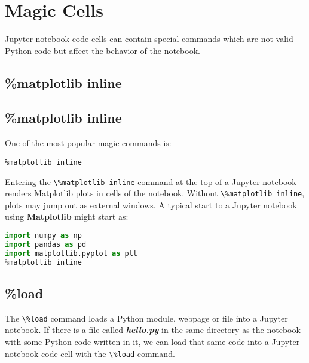 \documentclass{book}
\newcommand{\passthrough}[1]{#1}
\begin{document}
    
        \hypertarget{magic-cells}{%
\section{Magic Cells}\label{magic-cells}}
    




    
        Jupyter notebook code cells can contain special commands which are not
valid Python code but affect the behavior of the notebook.
    




    
        \hypertarget{matplotlib-inline}{%
\subsection{\%matplotlib inline}\label{matplotlib-inline}}
    




    
        \hypertarget{matplotlib-inline}{%
\subsection{\%matplotlib inline}\label{matplotlib-inline}}

One of the most popular magic commands is:

\begin{lstlisting}
%matplotlib inline
\end{lstlisting}

Entering the \passthrough{\lstinline!\%matplotlib inline!} command at
the top of a Jupyter notebook renders Matplotlib plots in cells of the
notebook. Without \passthrough{\lstinline!\%matplotlib inline!}, plots
may jump out as external windows. A typical start to a Jupyter notebook
using \textbf{Matplotlib} might start as:

\begin{lstlisting}[language=Python]
import numpy as np
import pandas as pd
import matplotlib.pyplot as plt
%matplotlib inline
\end{lstlisting}
    




    
        \hypertarget{load}{%
\subsection{\%load}\label{load}}

The \passthrough{\lstinline!\%load!} command loads a Python module,
webpage or file into a Jupyter notebook. If there is a file called
\textbf{\emph{hello.py}} in the same directory as the notebook with some
Python code written in it, we can load that same code into a Jupyter
notebook code cell with the \passthrough{\lstinline!\%load!} command.
\end{document}
